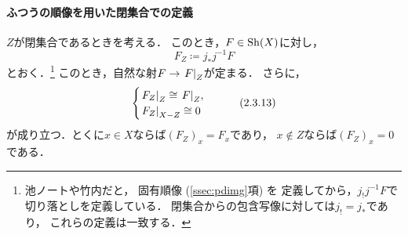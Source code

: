 \paragraph{ふつうの順像を用いた閉集合での定義}
\(Z\)が閉集合であるときを考える．
このとき，\(F\in\Sh(X)\)に対し，
\[
    F_Z\coloneqq j_{\ast}j^{-1}F
\]
とおく．\footnote{\label{CMT:supp-cut}
    池ノート\cite{Ike21}や竹内\cite{Tak17}だと，
    固有順像 (\ref{ssec:pdimg}項) を
    定義してから，\(j_{!}j^{-1}F\)で切り落としを定義している．
    閉集合からの包含写像に対しては\(j_!=j_\ast\)であり，
    これらの定義は一致する．
}
このとき，自然な射\(F\to \mres[F]{Z}\)が定まる．
さらに，
\begin{equation}\label{eq2313}
    \begin{cases}
        \mres[F_{Z}]{Z}\cong \mres[F]{Z},\\
        \mres[F_{Z}]{X-Z}\cong 0
    \end{cases}\tag{2.3.13}
\end{equation}
が成り立つ．とくに\(x\in X\)ならば\((F_Z)_x=F_x\)であり，
\(x\notin Z\)ならば\((F_Z)_x=0\)である．
